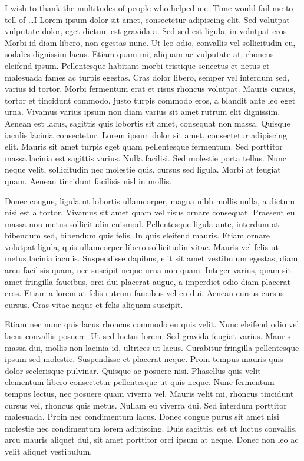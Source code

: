 \documentclass[12pt]{report}	%
\begin{document}
\begin{acknowledgments}		%
I wish to thank the multitudes of people who helped me. Time would fail me to tell of \ldots I Lorem ipsum dolor sit amet, consectetur adipiscing elit. Sed volutpat vulputate dolor, eget dictum est gravida a. Sed sed est ligula, in volutpat eros. Morbi id diam libero, non egestas nunc. Ut leo odio, convallis vel sollicitudin eu, sodales dignissim lacus. Etiam quam mi, aliquam ac vulputate at, rhoncus eleifend ipsum. Pellentesque habitant morbi tristique senectus et netus et malesuada fames ac turpis egestas. Cras dolor libero, semper vel interdum sed, varius id tortor. Morbi fermentum erat et risus rhoncus volutpat. Mauris cursus, tortor et tincidunt commodo, justo turpis commodo eros, a blandit ante leo eget urna. Vivamus varius ipsum non diam varius sit amet rutrum elit dignissim. Aenean est lacus, sagittis quis lobortis sit amet, consequat non massa. Quisque iaculis lacinia consectetur. Lorem ipsum dolor sit amet, consectetur adipiscing elit. Mauris sit amet turpis eget quam pellentesque fermentum. Sed porttitor massa lacinia est sagittis varius. Nulla facilisi. Sed molestie porta tellus. Nunc neque velit, sollicitudin nec molestie quis, cursus sed ligula. Morbi at feugiat quam. Aenean tincidunt facilisis nisl in mollis.

Donec congue, ligula ut lobortis ullamcorper, magna nibh mollis nulla, a dictum nisi est a tortor. Vivamus sit amet quam vel risus ornare consequat. Praesent eu massa non metus sollicitudin euismod. Pellentesque ligula ante, interdum at bibendum sed, bibendum quis felis. In quis eleifend mauris. Etiam ornare volutpat ligula, quis ullamcorper libero sollicitudin vitae. Mauris vel felis ut metus lacinia iaculis. Suspendisse dapibus, elit sit amet vestibulum egestas, diam arcu facilisis quam, nec suscipit neque urna non quam. Integer varius, quam sit amet fringilla faucibus, orci dui placerat augue, a imperdiet odio diam placerat eros. Etiam a lorem at felis rutrum faucibus vel eu dui. Aenean cursus cursus cursus. Cras vitae neque et felis aliquam suscipit.

Etiam nec nunc quis lacus rhoncus commodo eu quis velit. Nunc eleifend odio vel lacus convallis posuere. Ut sed luctus lorem. Sed gravida feugiat varius. Mauris massa dui, mollis non lacinia id, ultrices ut lacus. Curabitur fringilla pellentesque ipsum sed molestie. Suspendisse et placerat neque. Proin tempus mauris quis dolor scelerisque pulvinar. Quisque ac posuere nisi. Phasellus quis velit elementum libero consectetur pellentesque ut quis neque. Nunc fermentum tempus lectus, nec posuere quam viverra vel. Mauris velit mi, rhoncus tincidunt cursus vel, rhoncus quis metus. Nullam eu viverra dui. Sed interdum porttitor malesuada. Proin nec condimentum lacus. Donec congue purus sit amet nisi molestie nec condimentum lorem adipiscing. Duis sagittis, est ut luctus convallis, arcu mauris aliquet dui, sit amet porttitor orci ipsum at neque. Donec non leo ac velit aliquet vestibulum.


\end{acknowledgments}
\end{document}
